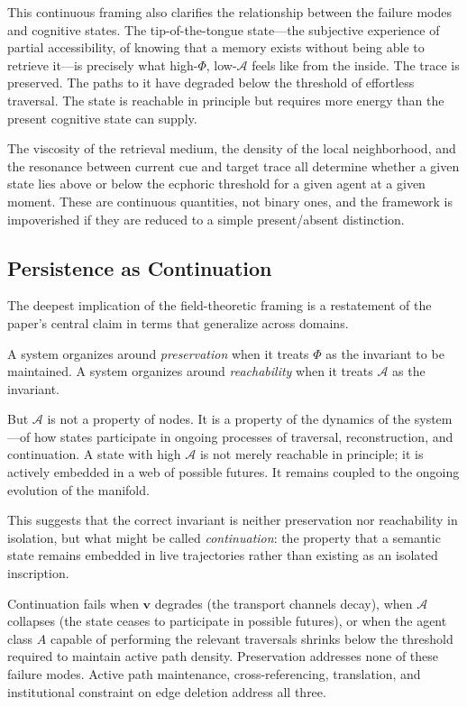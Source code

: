 \documentclass[12pt]{article}
\begin{document}
This continuous framing also clarifies the relationship between the
failure modes and cognitive states.
The tip-of-the-tongue state---the subjective experience of partial
accessibility, of knowing that a memory exists without being able to
retrieve it---is precisely what high-$\Phi$, low-$\mathcal{A}$ feels
like from the inside.
The trace is preserved.
The paths to it have degraded below the threshold of effortless
traversal.
The state is reachable in principle but requires more energy than the
present cognitive state can supply.

The viscosity of the retrieval medium, the density of the local
neighborhood, and the resonance between current cue and target trace
all determine whether a given state lies above or below the ecphoric
threshold for a given agent at a given moment.
These are continuous quantities, not binary ones, and the framework
is impoverished if they are reduced to a simple present/absent
distinction.

\subsection{Persistence as Continuation}

The deepest implication of the field-theoretic framing is a restatement
of the paper's central claim in terms that generalize across domains.

A system organizes around \emph{preservation} when it treats $\Phi$ as
the invariant to be maintained.
A system organizes around \emph{reachability} when it treats $\mathcal{A}$
as the invariant.

But $\mathcal{A}$ is not a property of nodes.
It is a property of the dynamics of the system---of how states participate
in ongoing processes of traversal, reconstruction, and continuation.
A state with high $\mathcal{A}$ is not merely reachable in principle;
it is actively embedded in a web of possible futures.
It remains coupled to the ongoing evolution of the manifold.

This suggests that the correct invariant is neither preservation nor
reachability in isolation, but what might be called \emph{continuation}:
the property that a semantic state remains embedded in live trajectories
rather than existing as an isolated inscription.

Continuation fails when $\mathbf{v}$ degrades (the transport channels
decay), when $\mathcal{A}$ collapses (the state ceases to participate
in possible futures), or when the agent class $A$ capable of performing
the relevant traversals shrinks below the threshold required to maintain
active path density.
Preservation addresses none of these failure modes.
Active path maintenance, cross-referencing, translation, and institutional
constraint on edge deletion address all three.
\end{document}
